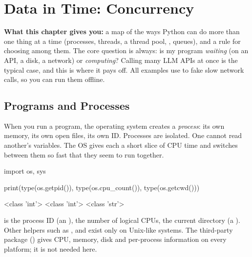 \chapter{Data in Time: Concurrency}

\textbf{What this chapter gives you:} a map of the ways Python can do more than one thing at a
time (processes, threads, a thread pool, , queues), and a rule for choosing among
them. The core question is always: is my program \emph{waiting} (on an API, a disk, a network) or
\emph{computing}? Calling many LLM APIs at once is the typical case, and this is where it pays off.
All examples use  to fake slow network calls, so you can run them offline.


\section{Programs and Processes}

When you run a program, the operating system creates a \emph{process}: its own memory, its own
open files, its own ID. Processes are isolated. One cannot read another's variables. The OS gives
each a short slice of CPU time and switches between them so fast that they seem to run together.

\begin{pycode}
import os, sys

print(type(os.getpid()), type(os.cpu_count()), type(os.getcwd()))
\end{pycode}
\begin{rawcode}
<class 'int'> <class 'int'> <class 'str'>
\end{rawcode}

 is the process ID (an ),  the number of logical
CPUs,  the current directory (a ). Other  helpers such as
,  and  exist only on Unix-like systems.
The third-party  package () gives CPU, memory, disk and
per-process information on every platform; it is not needed here.

